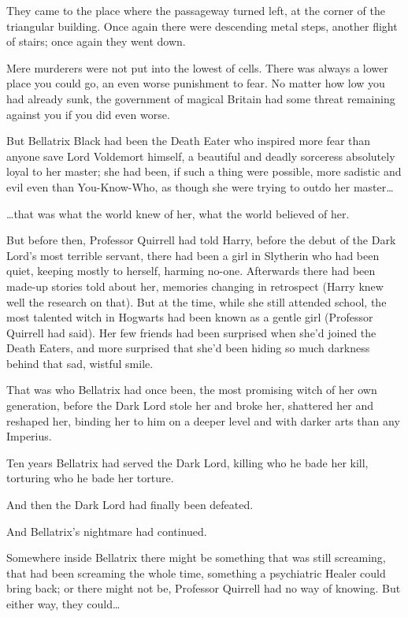 They came to the place where the passageway turned left, at the corner of the triangular building. Once again there were descending metal steps, another flight of stairs; once again they went down.

Mere murderers were not put into the lowest of cells. There was always a lower place you could go, an even worse punishment to fear. No matter how low you had already sunk, the government of magical Britain had some threat remaining against you if you did even worse.

But Bellatrix Black had been the Death Eater who inspired more fear than anyone save Lord Voldemort himself, a beautiful and deadly sorceress absolutely loyal to her master; she had been, if such a thing were possible, more sadistic and evil even than You-Know-Who, as though she were trying to outdo her master…

…that was what the world knew of her, what the world believed of her.

But before then, Professor Quirrell had told Harry, before the debut of the Dark Lord’s most terrible servant, there had been a girl in Slytherin who had been quiet, keeping mostly to herself, harming no-one. Afterwards there had been made-up stories told about her, memories changing in retrospect (Harry knew well the research on that). But at the time, while she still attended school, the most talented witch in Hogwarts had been known as a gentle girl (Professor Quirrell had said). Her few friends had been surprised when she’d joined the Death Eaters, and more surprised that she’d been hiding so much darkness behind that sad, wistful smile.

That was who Bellatrix had once been, the most promising witch of her own generation, before the Dark Lord stole her and broke her, shattered her and reshaped her, binding her to him on a deeper level and with darker arts than any Imperius.

Ten years Bellatrix had served the Dark Lord, killing who he bade her kill, torturing who he bade her torture.

And then the Dark Lord had finally been defeated.

And Bellatrix’s nightmare had continued.

Somewhere inside Bellatrix there might be something that was still screaming, that had been screaming the whole time, something a psychiatric Healer could bring back; or there might not be, Professor Quirrell had no way of knowing. But either way, they could…

